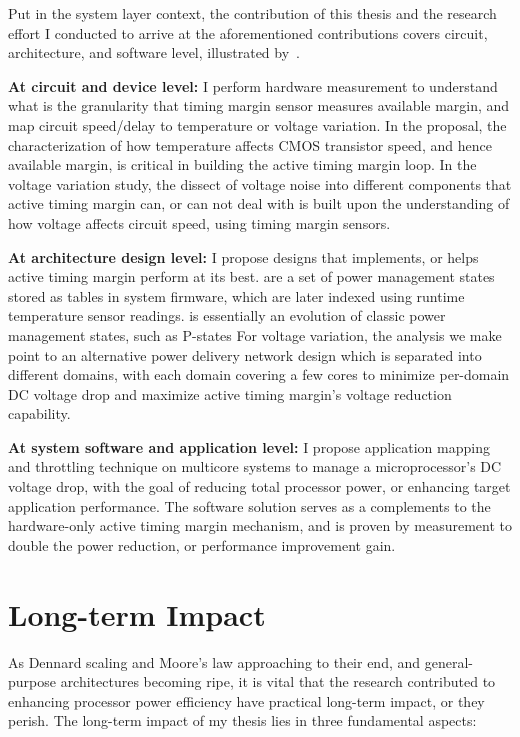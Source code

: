 Put in the system layer context, the contribution of this thesis and the research effort I conducted to arrive at the aforementioned contributions covers circuit, architecture, and software level, illustrated by~.

\textbf{At circuit and device level:} I perform hardware measurement to understand what is the granularity that timing margin sensor measures available margin, and map circuit speed/delay to temperature or voltage variation. In the \tistates proposal, the characterization of how temperature affects CMOS transistor speed, and hence available margin, is critical in building the active timing margin loop. In the voltage variation study, the dissect of voltage noise into different components that active timing margin can, or can not deal with is built upon the understanding of how voltage affects circuit speed, using timing margin sensors.

\textbf{At architecture design level:} I propose designs that implements, or helps active timing margin perform at its best. \tistates are a set of power management states stored as tables in system firmware, which are later indexed using runtime temperature sensor readings. \tistate is essentially an evolution of classic power management states, such as P-states For voltage variation, the analysis we make point to an alternative power delivery network design which is separated into different domains, with each domain covering a few cores to minimize per-domain DC voltage drop and maximize active timing margin's voltage reduction capability.

\textbf{At system software and application level:} I propose application mapping and throttling technique on multicore systems to manage a microprocessor's DC voltage drop, with the goal of reducing total processor power, or enhancing target application performance. The software solution serves as a complements to the hardware-only active timing margin mechanism, and is proven by measurement to double the power reduction, or performance improvement gain.

\section{Long-term Impact}
\label{sec:intro:impact}

As Dennard scaling and Moore's law approaching to their end, and general-purpose architectures becoming ripe, it is vital that the research contributed to enhancing processor power efficiency have practical long-term impact, or they perish. The long-term impact of my thesis lies in three fundamental aspects:

